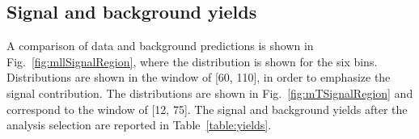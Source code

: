 \subsection{Signal and background yields}\label{subsec:yields}

A comparison of data and background predictions is shown in Fig.~\ref{fig:mllSignalRegion}, where the \mll{} distribution is shown for the six \pth bins. Distributions are shown in the \mt window of [60, 110]\GeV, in order to emphasize the signal contribution. The \mt distributions are shown in Fig.~\ref{fig:mTSignalRegion} and correspond to the \mll window of [12, 75]\GeV. The signal and background yields after the analysis selection are reported in Table~\ref{table:yields}.

\begin{figure}[htbp]
\centering
{}
\\
\end{figure}
